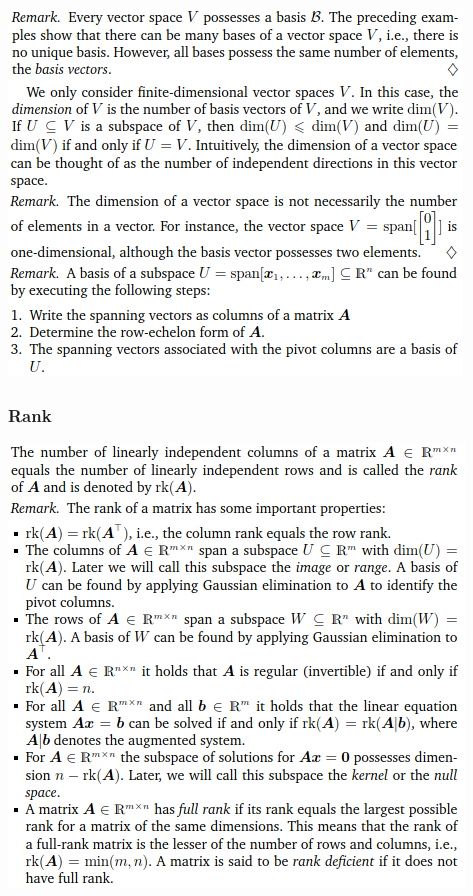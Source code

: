 \documentclass[oneside,10pt]{scrartcl}
\begin{document}
\begin{multicols*}{2}
\includegraphics[width=\linewidth]{2.6_2}

\subsubsection*{Rank}
\includegraphics[width=\linewidth]{2.6_3}



\end{multicols*}
\end{document}

